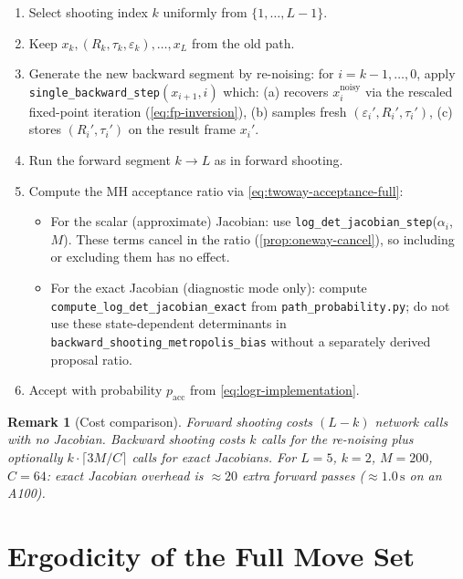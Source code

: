 \documentclass[11pt,a4paper]{article}
\newtheorem{remark}[theorem]{Remark}
\newcommand{\xnoisy}{x^{\mathrm{noisy}}}
\newcommand{\pacc}{p_{\mathrm{acc}}}
\begin{document}
\begin{enumerate}
  \item Select shooting index $k$ uniformly from $\{1,\ldots,L-1\}$.
  \item Keep $x_k, (R_k, \tau_k, \varepsilon_k), \ldots, x_L$ from
        the old path.
  \item Generate the new backward segment by re-noising:
        for $i = k-1, \ldots, 0$, apply
        \texttt{single\_backward\_step}$(x_{i+1}, i)$ which:
        (a) recovers $\xnoisy_i$ via the rescaled fixed-point iteration
        (\cref{eq:fp-inversion}),
        (b) samples fresh $(\varepsilon_i', R_i', \tau_i')$,
        (c) stores $(R_i', \tau_i')$ on the result frame $x_i'$.
  \item Run the forward segment $k \to L$ as in forward shooting.
  \item Compute the MH acceptance ratio via
        \cref{eq:twoway-acceptance-full}:
        \begin{itemize}
          \item For the scalar (approximate) Jacobian: use
            \texttt{log\_det\_jacobian\_step}($\alpha_i$, $M$).
            These terms cancel in the ratio (\cref{prop:oneway-cancel}),
            so including or excluding them has no effect.
          \item For the exact Jacobian (diagnostic mode only): compute
            \texttt{compute\_log\_det\_jacobian\_exact} from
            \texttt{path\_probability.py}; do not use these
            state-dependent determinants in
            \texttt{backward\_shooting\_metropolis\_bias} without a
            separately derived proposal ratio.
        \end{itemize}
  \item Accept with probability $\pacc$ from \cref{eq:logr-implementation}.
\end{enumerate}

\begin{remark}[Cost comparison]
  Forward shooting costs $(L-k)$ network calls with no Jacobian.
  Backward shooting costs $k$ calls for the re-noising plus
  optionally $k \cdot \lceil 3M/C\rceil$ calls for exact Jacobians.
  For $L=5$, $k=2$, $M=200$, $C=64$: exact Jacobian overhead is
  $\approx 20$ extra forward passes ($\approx 1.0\,\mathrm{s}$ on an A100).
\end{remark}

\section{Ergodicity of the Full Move Set}
\label{sec:ergodicity}
\end{document}

